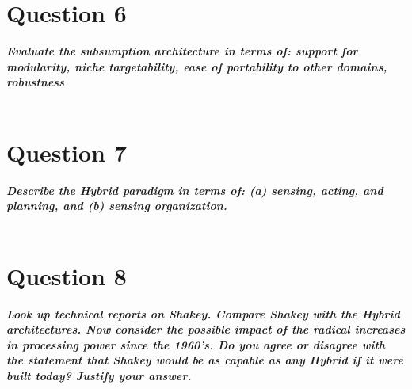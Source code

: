 \documentclass{article}
\newcommand\tab[1][1cm]{\hspace*{#1}}
\begin{document}
\section*{Question 6}
\textbf{\textit{
    \tab Evaluate  the  subsumption  architecture  in  terms  of:  support  for modularity, niche targetability, ease of portability to other domains, robustness
}} \\ \\
\section*{Question 7}
\textbf{\textit{
    \tab Describe the Hybrid paradigm in terms of: (a) sensing, acting, and planning, and (b) sensing organization.
}} \\ \\
\section*{Question 8}
\textbf{\textit{
    \tab Look up technical reports on Shakey. Compare Shakey with the Hybrid architectures.  Now  consider  the  possible  impact  of the  radical  increases  in processing power since the 1960’s. Do you agree or disagree with the statement that Shakey would be as capable as any Hybrid if it were built today? Justify your answer.
}} \\ \\
\end{document}
